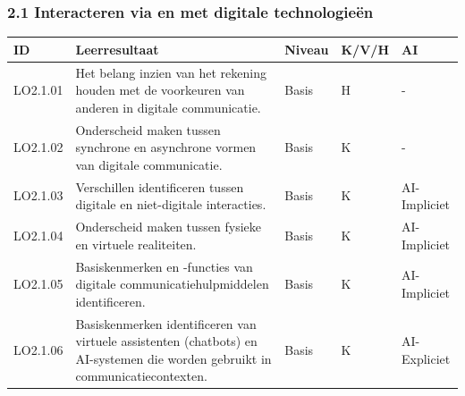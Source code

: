 \documentclass[
  dutch,
  letterpaper,
  DIV=11,
  numbers=noendperiod]{scrartcl}
\begin{document}
\subsubsection{2.1 Interacteren via en met digitale
technologieën}\label{interacteren-via-en-met-digitale-technologieuxebn}

\begin{longtable}[]{@{}
  >{\centering\arraybackslash}p{}
  >{\centering\arraybackslash}p{}
  >{\centering\arraybackslash}p{}
  >{\centering\arraybackslash}p{}
  >{\centering\arraybackslash}p{}@{}}
\toprule\noalign{}
\begin{minipage}[b]{\linewidth}\centering
ID
\end{minipage} & \begin{minipage}[b]{\linewidth}\centering
Leerresultaat
\end{minipage} & \begin{minipage}[b]{\linewidth}\centering
Niveau
\end{minipage} & \begin{minipage}[b]{\linewidth}\centering
K/V/H
\end{minipage} & \begin{minipage}[b]{\linewidth}\centering
AI
\end{minipage} \\
\midrule\noalign{}
\endhead
\bottomrule\noalign{}
\endlastfoot
LO2.1.01 & Het belang inzien van het rekening houden met de voorkeuren
van anderen in digitale communicatie. & Basis & H & - \\
LO2.1.02 & Onderscheid maken tussen synchrone en asynchrone vormen van
digitale communicatie. & Basis & K & - \\
LO2.1.03 & Verschillen identificeren tussen digitale en niet-digitale
interacties. & Basis & K & AI-Impliciet \\
LO2.1.04 & Onderscheid maken tussen fysieke en virtuele realiteiten. &
Basis & K & AI-Impliciet \\
LO2.1.05 & Basiskenmerken en -functies van digitale
communicatiehulpmiddelen identificeren. & Basis & K & AI-Impliciet \\
LO2.1.06 & Basiskenmerken identificeren van virtuele assistenten
(chatbots) en AI-systemen die worden gebruikt in communicatiecontexten.
& Basis & K & AI-Expliciet \\

\end{longtable}
\end{document}
